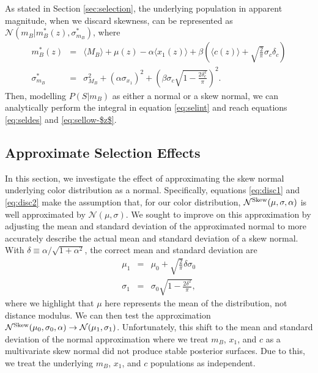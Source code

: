 \documentclass[a4paper,fleqn,usenatbib,manuscript]{emulateapj}
\begin{document}
As stated in Section \ref{sec:selection}, the underlying population in apparent magnitude, when we discard skewness, can be represented as $\mathcal{N}(m_B|m_B^*(z), \sigma^*_{m_B})$, where
\begin{eqnarray}
m_B^*(z) &=& \langle M_B \rangle + \mu(z) - \alpha \langle x_1(z) \rangle + \beta \left(\langle c(z) \rangle + \sqrt{\frac{2}{\pi}}\sigma_c \delta_c\right)\label{eq:disc1} \\
\sigma^*_{m_B} &=& \sigma_{M_B}^2 + (\alpha \sigma_{x_1})^2 +  \left(\beta \sigma_c \sqrt{1 - \frac{2\delta_c^2}{\pi}}\right)^2. \label{eq:disc2}
\end{eqnarray}
Then, modelling $P(S|m_B)$ as either a normal or a skew normal, we can analytically perform the integral in equation \eqref{eq:selint} and reach equations \eqref{eq:seldes} and \eqref{eq:sellow-$z$}.





\subsection{Approximate Selection Effects}
\label{app:approx}

In this section, we investigate the effect of approximating the skew normal underlying color distribution as a normal. Specifically, equations \eqref{eq:disc1} and \eqref{eq:disc2} make the assumption that, for our color distribution, $\mathcal{N}^{\rm Skew}(\mu, \sigma, \alpha)$ is well approximated by $\mathcal{N}(\mu, \sigma)$. We sought to improve on this approximation by adjusting the mean and standard deviation of the approximated normal to more accurately describe the actual mean and standard deviation of a skew normal. With $\delta \equiv \alpha/\sqrt{1+\alpha^2}$, the correct mean and standard deviation are
\begin{eqnarray}
\mu_1 &=& \mu_0 + \sqrt{\frac{2}{\pi}} \delta \sigma_0 \\
\sigma_1 &=& \sigma_0 \sqrt{1 - \frac{2 \delta^2}{\pi}},
\end{eqnarray}
where we highlight that $\mu$ here represents the mean of the distribution, not distance modulus. We can then test the approximation $\mathcal{N}^{\rm Skew}(\mu_0, \sigma_0, \alpha) \rightarrow \mathcal{N}(\mu_1, \sigma_1)$. Unfortunately, this shift to the mean and standard deviation of the normal approximation where we treat $m_B$, $x_1$, and $c$ as a multivariate skew normal did not produce stable posterior surfaces. Due to this, we treat the underlying $m_B$, $x_1$, and $c$ populations as independent. 
\end{document}
